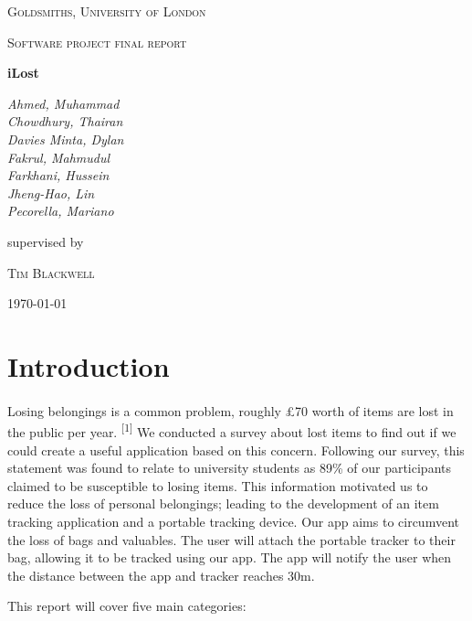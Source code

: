 \documentclass[12pt,a4paper]{article}
\begin{document}
    \begin{titlepage}
      \centering
      {\scshape\LARGE Goldsmiths, University of London \par}
      \vspace{1cm}
      {\scshape\Large Software project final report\par}
      \vspace{1.5cm}
      {\huge\bfseries iLost\par}
      \vspace{2cm}
      {\Large\itshape 
        Ahmed, Muhammad\\
        Chowdhury, Thairan\\
        Davies Minta, Dylan\\     
        Fakrul, Mahmudul\\    
        Farkhani, Hussein\\ 
        Jheng-Hao, Lin\\
        Pecorella, Mariano\\ \par}
      \vfill
      supervised by\par
      \textsc{Tim Blackwell} 
      \vfill
      {\large \today \par}
    \end{titlepage}
    \tableofcontents
    \newpage
    \section{Introduction}
      \paragraph{} Losing belongings is a common problem, roughly £70 worth of items are lost in the public per year. \textsuperscript{[1]} We conducted a survey about lost items to find out if we could create a useful application based on this concern. Following our survey, this statement was found to relate to university students as 89\% of our participants claimed to be susceptible to losing items. This information motivated us to reduce the loss of personal belongings; leading to the development of an item tracking application and a portable tracking device. Our app aims to circumvent the loss of bags and valuables. The user will attach the portable tracker to their bag, allowing it to be tracked using our app. The app will notify the user when the distance between the app and tracker reaches 30m.

      This report will cover five main categories:
\end{document}

